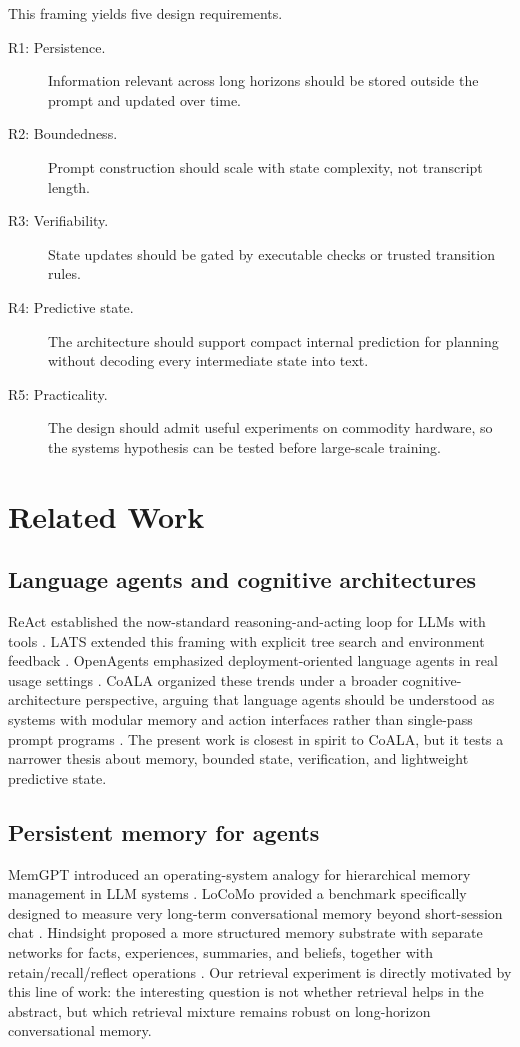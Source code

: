 \documentclass[11pt]{article}
\begin{document}
This framing yields five design requirements.
\begin{description}
    \item[R1: Persistence.] Information relevant across long horizons should be stored outside the prompt and updated over time.
    \item[R2: Boundedness.] Prompt construction should scale with state complexity, not transcript length.
    \item[R3: Verifiability.] State updates should be gated by executable checks or trusted transition rules.
    \item[R4: Predictive state.] The architecture should support compact internal prediction for planning without decoding every intermediate state into text.
    \item[R5: Practicality.] The design should admit useful experiments on commodity hardware, so the systems hypothesis can be tested before large-scale training.
\end{description}

\section{Related Work}
\subsection{Language agents and cognitive architectures}
ReAct established the now-standard reasoning-and-acting loop for LLMs with tools \citep{react2023}. LATS extended this framing with explicit tree search and environment feedback \citep{lats2023}. OpenAgents emphasized deployment-oriented language agents in real usage settings \citep{openagents2023}. CoALA organized these trends under a broader cognitive-architecture perspective, arguing that language agents should be understood as systems with modular memory and action interfaces rather than single-pass prompt programs \citep{coala2023}. The present work is closest in spirit to CoALA, but it tests a narrower thesis about memory, bounded state, verification, and lightweight predictive state.

\subsection{Persistent memory for agents}
MemGPT introduced an operating-system analogy for hierarchical memory management in LLM systems \citep{memgpt2023}. LoCoMo provided a benchmark specifically designed to measure very long-term conversational memory beyond short-session chat \citep{locomo2024}. Hindsight proposed a more structured memory substrate with separate networks for facts, experiences, summaries, and beliefs, together with retain/recall/reflect operations \citep{hindsight2025}. Our retrieval experiment is directly motivated by this line of work: the interesting question is not whether retrieval helps in the abstract, but which retrieval mixture remains robust on long-horizon conversational memory.
\end{document}

